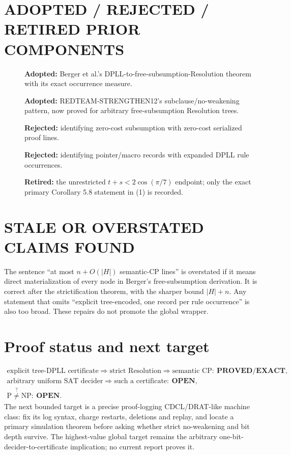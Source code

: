 \documentclass[11pt]{article}
\newcommand{\EXACT}{\textbf{PROVED/EXACT}}
\newcommand{\OPEN}{\textbf{OPEN}}
\begin{document}
\section{ADOPTED / REJECTED / RETIRED PRIOR COMPONENTS}
\begin{description}
\item[] \textbf{Adopted:} Berger et al.'s DPLL-to-free-subsumption-Resolution
theorem with its exact occurrence measure.
\item[] \textbf{Adopted:} REDTEAM-STRENGTHEN12's subclause/no-weakening
pattern, now proved for arbitrary free-subsumption Resolution trees.
\item[] \textbf{Rejected:} identifying zero-cost subsumption with zero-cost
serialized proof lines.
\item[] \textbf{Rejected:} identifying pointer/macro records with expanded
DPLL rule occurrences.
\item[] \textbf{Retired:} the unrestricted
$t+s<2\cos(\pi/7)$ endpoint; only the exact primary Corollary 5.8 statement
in (1) is recorded.
\end{description}

\section{STALE OR OVERSTATED CLAIMS FOUND}
The sentence ``at most $n+O(|H|)$ semantic-CP lines'' is overstated if it
means direct materialization of every node in Berger's free-subsumption
derivation.  It is correct after the strictification theorem, with the sharper
bound $|H|+n$.  Any statement that omits ``explicit tree-encoded, one record
per rule occurrence'' is also too broad.  These repairs do not promote the
global wrapper.

\section{Proof status and next target}
\[
\boxed{
 \begin{array}{l}
 \text{explicit tree-DPLL certificate}\Rightarrow
 \text{strict Resolution}\Rightarrow\text{semantic CP}:\ \EXACT,\\
 \text{arbitrary uniform SAT decider}\Rightarrow
 \text{such a certificate}:\ \OPEN,\\
 \mathrm{P}\stackrel{?}{\ne}\mathrm{NP}:\ \OPEN.
 \end{array}}
\]
The next bounded target is a precise proof-logging CDCL/DRAT-like machine
class: fix its log syntax, charge restarts, deletions and replay, and locate a
primary simulation theorem before asking whether strict no-weakening and bit
depth survive.  The highest-value global target remains the arbitrary
one-bit-decider-to-certificate implication; no current report proves it.
\end{document}
